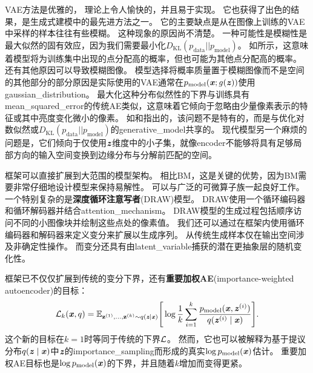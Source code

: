 \gls{VAE}方法是优雅的， 理论上令人愉快的，并且易于实现。
它也获得了出色的结果，是生成式建模中的最先进方法之一。
它的主要缺点是从在图像上训练的\gls{VAE}中采样的样本往往有些模糊。
这种现象的原因尚不清楚。
一种可能性是模糊性是最大似然的固有效应，因为我们需要最小化$D_{\text{KL}}(p_{\text{data}} ||p_{\text{model}} )$。
如所示，这意味着模型将为训练集中出现的点分配高的概率，但也可能为其他点分配高的概率。
还有其他原因可以导致模糊图像。
模型选择将概率质量置于模糊图像而不是空间的其他部分的部分原因是实际使用的\gls{VAE}通常在$p_{\text{model}}(\boldsymbol{\mathit{x}}; g(\boldsymbol{\mathit{z}}))$使用\gls{gaussian_distribution}。
最大化这种分布似然性的下界与训练具有\gls{mean_squared_error}的传统\gls{AE}类似，这意味着它倾向于忽略由少量像素表示的特征或其中亮度变化微小的像素。
如\citet{Theis2015d}和\citet{Huszar-arXiv2015}指出的，该问题不是特有的，而是与优化对数似然或$D_{\text{KL}}(p_{\text{data}} ||p_{\text{model}} )$的\gls{generative_model}共享的。
现代模型另一个麻烦的问题是，它们倾向于仅使用$\boldsymbol{\mathit{z}}$维度中的小子集，就像\gls{encoder}不能够将具有足够局部方向的输入空间变换到边缘分布与分解前匹配的空间。


框架可以直接扩展到大范围的模型架构。
相比\gls{BM}，这是关键的优势，因为\gls{BM}需要非常仔细地设计模型来保持易解性。
可以与广泛的可微算子族一起良好工作。
一个特别复杂的是\textbf{深度循环注意写者}(DRAW)模型\citep{Gregor2015}。
DRAW使用一个循环编码器和循环解码器并结合\gls{attention_mechanism}。
DRAW模型的生成过程包括顺序访问不同的小图像块并绘制这些点处的像素值。
我们还可以通过在框架内使用循环编码器和解码器来定义变分\citep{Chung-et-al-NIPS2015}来扩展以生成序列。
从传统生成样本仅在输出空间涉及非确定性操作。
而变分还具有由\gls{latent_variable}捕获的潜在更抽象层的随机变化性。


框架已不仅仅扩展到传统的变分下界，还有\textbf{重要加权\gls{AE}}(importance-weighted autoencoder)\citep{burda2015importance}的目标：
\begin{align}
 \mathcal{L}_k(\boldsymbol{\mathit{x}}, q) = \mathbb{E}_{\mathbf{z}^{(1)},\dots,\mathbf{z}^{(k)} \sim q(\boldsymbol{\mathit{z}}  \mid  \boldsymbol{\mathit{x}})}
 \Bigg[ \log \frac{1}{k} \sum_{i=1}^k 
 \frac{p_{\text{model}}(\boldsymbol{\mathit{x}}, \boldsymbol{\mathit{z}}^{(i)})}{q(\boldsymbol{\mathit{z}}^{(i)}  \mid  \boldsymbol{\mathit{x}})} \Bigg].
\end{align}
这个新的目标在$k=1$时等同于传统的下界$\mathcal{L}$。
然而，它也可以被解释为基于提议分布$q(\boldsymbol{\mathit{z}}  \mid  \boldsymbol{\mathit{x}})$中$\boldsymbol{\mathit{z}}$的\gls{importance_sampling}而形成的真实$\log p_{\text{model}}(\boldsymbol{\mathit{x}})$估计。
重要加权\gls{AE}目标也是$\log p_{\text{model}}(\boldsymbol{\mathit{x}})$的下界，并且随着$k$增加而变得更紧。


